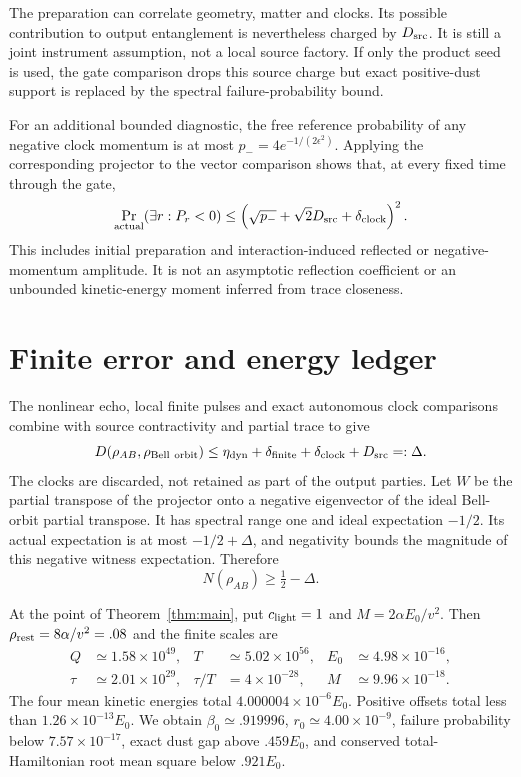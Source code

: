 \documentclass[11pt]{article}
\begin{document}
The preparation can correlate geometry, matter and clocks.
Its possible contribution to output entanglement is nevertheless charged by $D_{\rm src}$.
It is still a joint instrument assumption, not a local source factory.
If only the product seed is used, the gate comparison drops this source charge but exact positive-dust support is replaced by the spectral failure-probability bound.

For an additional bounded diagnostic, the free reference probability of any negative clock momentum is at most $p_-=4e^{-1/(2\epsilon^2)}$.
Applying the corresponding projector to the vector comparison shows that, at every fixed time through the gate,
\begin{equation}
 \Pr_{\rm actual}(\exists r:P_r<0)
 \le\left(\sqrt{p_-}+\sqrt2D_{\rm src}+\delta_{\rm clock}\right)^2.\label{eq:reflection}
\end{equation}
This includes initial preparation and interaction-induced reflected or negative-momentum amplitude.
It is not an asymptotic reflection coefficient or an unbounded kinetic-energy moment inferred from trace closeness.

\section{Finite error and energy ledger}\label{sec:numerics}

The nonlinear echo, local finite pulses and exact autonomous clock comparisons combine with source contractivity and partial trace to give
\begin{equation}
 D(\rho_{AB},\rho_{\rm Bell\ orbit})
 \le\eta_{\rm dyn}+\delta_{\rm finite}+\delta_{\rm clock}+D_{\rm src}
 =:\Delta.\label{eq:totalerror}
\end{equation}
The clocks are discarded, not retained as part of the output parties.
Let $W$ be the partial transpose of the projector onto a negative eigenvector of the ideal Bell-orbit partial transpose.
It has spectral range one and ideal expectation $-1/2$.
Its actual expectation is at most $-1/2+\Delta$, and negativity bounds the magnitude of this negative witness expectation.
Therefore
\begin{equation}
 N(\rho_{AB})\ge\tfrac12-\Delta.\label{eq:negativity}
\end{equation}

At the point of Theorem~\ref{thm:main}, put $c_{\rm light}=1$ and $M=2\alpha E_0/v^2$.
Then $\rho_{\rm rest}=8\alpha/v^2=.08$ and the finite scales are
\begin{align}
 Q&\simeq1.58\times10^{49},&T&\simeq5.02\times10^{56},&E_0&\simeq4.98\times10^{-16},\nonumber\\
 \tau&\simeq2.01\times10^{29},&\tau/T&=4\times10^{-28},&M&\simeq9.96\times10^{-18}.\label{eq:resources}
\end{align}
The four mean kinetic energies total $4.000004\times10^{-6}E_0$.
Positive offsets total less than $1.26\times10^{-13}E_0$.
We obtain $\beta_0\simeq.919996$, $r_0\simeq4.00\times10^{-9}$, failure probability below $7.57\times10^{-17}$, exact dust gap above $.459E_0$, and conserved total-Hamiltonian root mean square below $.921E_0$.
\end{document}
